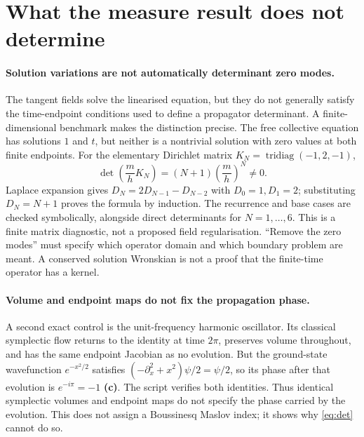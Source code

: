 \documentclass[11pt]{article}
\newcommand{\Lc}{\textbf{(c)}}
\begin{document}
\section{What the measure result does not determine}
\paragraph{Solution variations are not automatically determinant zero modes.}
The tangent fields solve the linearised equation, but they do not generally
satisfy the time-endpoint conditions used to define a propagator determinant.
A finite-dimensional benchmark makes the distinction precise. The free
collective equation has solutions $1$ and $t$, but neither is a nontrivial
solution with zero values at both finite endpoints. For the elementary
Dirichlet matrix $K_N=\operatorname{tridiag}(-1,2,-1)$,
\begin{equation}
 \det\left(\frac{m}{h}K_N\right)
 =(N+1)\left(\frac{m}{h}\right)^N\ne0.
\end{equation}
Laplace expansion gives $D_N=2D_{N-1}-D_{N-2}$ with $D_0=1,D_1=2$;
substituting $D_N=N+1$ proves the formula by induction. The recurrence and
base cases are checked symbolically, alongside direct determinants for
$N=1,\ldots,6$. This is a finite matrix diagnostic, not a
proposed field regularisation. ``Remove the zero modes'' must specify which
operator domain and which boundary problem are meant. A conserved solution
Wronskian is not a proof that the finite-time operator has a kernel.

\paragraph{Volume and endpoint maps do not fix the propagation phase.}
A second exact control is the unit-frequency harmonic oscillator. Its
classical symplectic flow returns to the identity at time $2\pi$, preserves
volume throughout, and has the same endpoint Jacobian as no evolution.
But the ground-state wavefunction $e^{-x^2/2}$ satisfies
$(-\partial_x^2+x^2)\psi/2=\psi/2$, so its phase after that evolution is
$e^{-i\pi}=-1$ \Lc. The script verifies both identities. Thus identical
symplectic volumes and endpoint maps do not specify the phase carried by
the evolution. This does not assign a Boussinesq Maslov index; it shows why
\eqref{eq:det} cannot do so.
\end{document}
